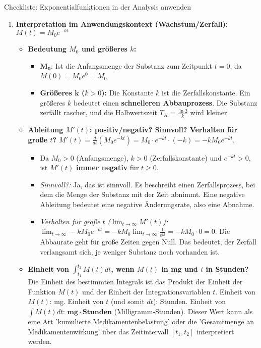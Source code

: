 \begin{loesungsumgebung}{Checkliste: Exponentialfunktionen in der Analysis anwenden}
\begin{enumerate}[label=(\alph*)]
    \item \textbf{Interpretation im Anwendungskontext (Wachstum/Zerfall): $M(t) = M_0 e^{-kt}$}
    \begin{itemize}
        \item \textbf{Bedeutung $M_0$ und größeres $k$:}
        \begin{itemize}
            \item $\mathbf{M_0}$: Ist die Anfangsmenge der Substanz zum Zeitpunkt $t=0$, da $M(0) = M_0 e^0 = M_0$.
            \item \textbf{Größeres $\mathbf{k}$ ($k>0$):} Die Konstante $k$ ist die Zerfallskonstante. Ein größeres $k$ bedeutet einen \textbf{schnelleren Abbauprozess}. Die Substanz zerfällt rascher, und die Halbwertszeit $T_H = \frac{\ln 2}{k}$ wird kleiner.
        \end{itemize}
        \item \textbf{Ableitung $M'(t)$: positiv/negativ? Sinnvoll? Verhalten für große $t$?}
        $M'(t) = \frac{d}{dt}(M_0 e^{-kt}) = M_0 \cdot e^{-kt} \cdot (-k) = -kM_0e^{-kt}$.
        \begin{itemize}
            \item Da $M_0 > 0$ (Anfangsmenge), $k > 0$ (Zerfallskonstante) und $e^{-kt} > 0$, ist $M'(t)$ \textbf{immer negativ} für $t \ge 0$.
            \item \textit{Sinnvoll?:} Ja, das ist sinnvoll. Es beschreibt einen Zerfallsprozess, bei dem die Menge der Substanz mit der Zeit abnimmt. Eine negative Ableitung bedeutet eine negative Änderungsrate, also eine Abnahme.
            \item \textit{Verhalten für große $t$ ($\lim_{t \to \infty} M'(t)$):}
            $\lim_{t \to \infty} -kM_0e^{-kt} = -kM_0 \lim_{t \to \infty} \frac{1}{e^{kt}} = -kM_0 \cdot 0 = 0$.
            Die Abbaurate geht für große Zeiten gegen Null. Das bedeutet, der Zerfall verlangsamt sich, je weniger Substanz noch vorhanden ist.
        \end{itemize}
        \item \textbf{Einheit von $\int_{t_1}^{t_2} M(t) dt$, wenn $M(t)$ in mg und $t$ in Stunden?}
        Die Einheit des bestimmten Integrals ist das Produkt der Einheit der Funktion $M(t)$ und der Einheit der Integrationsvariablen $t$.
        Einheit von $M(t)$: mg.
        Einheit von $t$ (und somit $dt$): Stunden.
        Einheit von $\int M(t) dt$: $\mathbf{mg \cdot Stunden}$ (Milligramm-Stunden).
        Dieser Wert kann als eine Art 'kumulierte Medikamentenbelastung' oder die 'Gesamtmenge an Medikamentenwirkung' über das Zeitintervall $[t_1, t_2]$ interpretiert werden.
    \end{itemize}
\end{enumerate}

\end{loesungsumgebung}